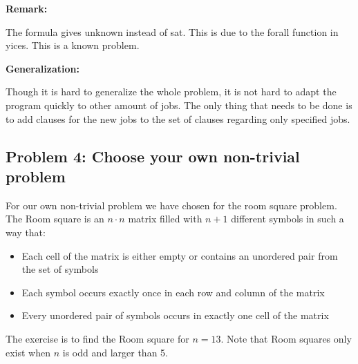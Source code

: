 \documentclass[12pt]{article}
\begin{document}
{\bf Remark:}

The formula gives unknown instead of sat. This is due to the forall function in yices. This is a known problem.\\

\vspace{3mm}

{\bf Generalization:}

Though it is hard to generalize the whole problem, it is not hard to adapt the program quickly to other amount of jobs. The only thing that needs to be done is to add clauses for the new jobs to the set of clauses regarding only specified jobs.\\

\vspace{3mm}

\subsection*{Problem 4: Choose your own non-trivial problem}

For our own non-trivial problem we have chosen for the room square problem. The Room square is an $n \cdot n$ matrix filled with $n+1$ different symbols in such a way that:\\
\begin{itemize}
\item Each cell of the matrix is either empty or contains an unordered pair from the set of symbols
\item Each symbol occurs exactly once in each row and column of the matrix
\item Every unordered pair of symbols occurs in exactly one cell of the matrix
\end{itemize}
The exercise is to find the Room square for $n = 13$. Note that Room squares only exist when $n$ is odd and larger than 5.
\vspace{8mm}
\end{document}
